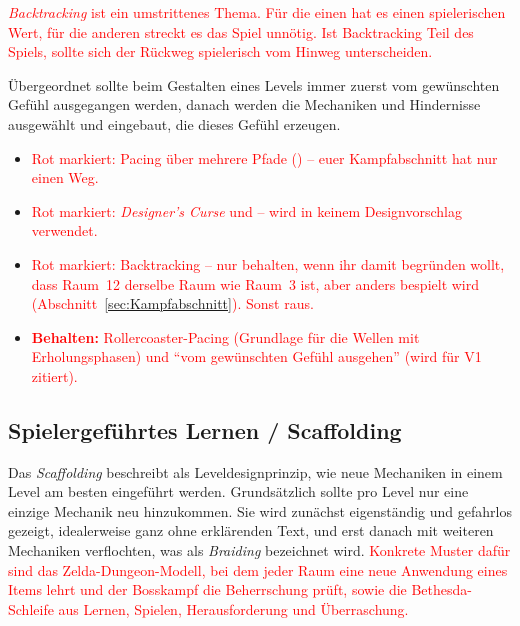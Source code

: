 \documentclass[../Main.tex]{subfiles}
\begin{document}
\textcolor{red}{\textit{Backtracking} ist ein umstrittenes Thema. Für die einen hat es einen spielerischen Wert, für die anderen streckt es das Spiel unnötig. Ist Backtracking Teil des Spiels, sollte sich der Rückweg spielerisch vom Hinweg unterscheiden.\autocite{gdc_tenprinciples2010}}

Übergeordnet sollte beim Gestalten eines Levels immer zuerst vom gewünschten Gefühl ausgegangen werden, danach werden die Mechaniken und Hindernisse ausgewählt und eingebaut, die dieses Gefühl erzeugen.\autocite{gdc_tenprinciples2010}

\begin{itemize}[leftmargin=1.5cm]
    \item \textcolor{red}{Rot markiert: Pacing über mehrere Pfade () -- euer Kampfabschnitt hat nur einen Weg.}
    \item \textcolor{red}{Rot markiert: \textit{Designer's Curse} und  -- wird in keinem Designvorschlag verwendet.}
    \item \textcolor{red}{Rot markiert: Backtracking -- nur behalten, wenn ihr damit begründen wollt, dass Raum~12 derselbe Raum wie Raum~3 ist, aber anders bespielt wird (Abschnitt~\ref{sec:Kampfabschnitt}). Sonst raus.}
    \item \textcolor{red}{\textbf{Behalten:} Rollercoaster-Pacing (Grundlage für die Wellen mit Erholungsphasen) und \enquote{vom gewünschten Gefühl ausgehen} (wird für V1 zitiert).}
\end{itemize}

\subsection{Spielergeführtes Lernen / Scaffolding} \label{sec:Scaffolding}
Das \textit{Scaffolding} beschreibt als Leveldesignprinzip, wie neue Mechaniken in einem Level am besten eingeführt werden.\autocite{totten2014architectural} Grundsätzlich sollte pro Level nur eine einzige Mechanik neu hinzukommen.\autocite{gdc_tenprinciples2010} Sie wird zunächst eigenständig und gefahrlos gezeigt, idealerweise ganz ohne erklärenden Text, und erst danach mit weiteren Mechaniken verflochten, was als \textit{Braiding} bezeichnet wird.\autocite{gdc_movingmountains2020} \textcolor{red}{Konkrete Muster dafür sind das Zelda-Dungeon-Modell, bei dem jeder Raum eine neue Anwendung eines Items lehrt und der Bosskampf die Beherrschung prüft, sowie die Bethesda-Schleife aus Lernen, Spielen, Herausforderung und Überraschung.\autocite{gdc_tenprinciples2010}}
\end{document}
